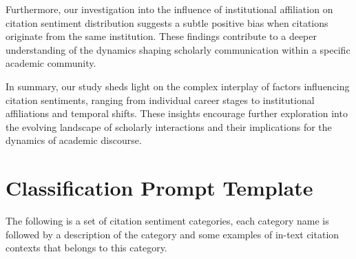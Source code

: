 \documentclass[sigconf]{acmart}
\begin{document}
Furthermore, our investigation into the influence of institutional affiliation on citation sentiment distribution suggests a subtle positive bias when citations originate from the same institution. These findings contribute to a deeper understanding of the dynamics shaping scholarly communication within a specific academic community.

In summary, our study sheds light on the complex interplay of factors influencing citation sentiments, ranging from individual career stages to institutional affiliations and temporal shifts. These insights encourage further exploration into the evolving landscape of scholarly interactions and their implications for the dynamics of academic discourse.






\appendix

\section{Classification Prompt Template}
\label{appendix:classification-prompt}
The following is a set of citation sentiment categories, each category name is followed by a description of the category and some examples of in-text citation contexts that belongs to this category.
\end{document}

